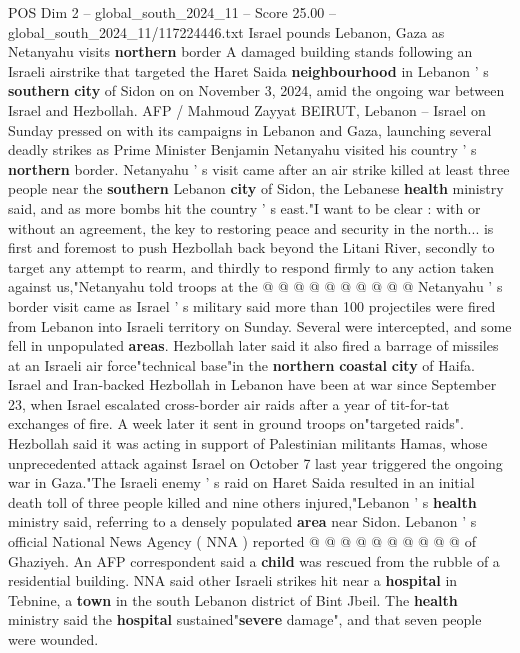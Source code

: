 \begin{textsample}{POS Dim 2 – global\_south\_2024\_11 – Score 25.00 – global\_south\_2024\_11/117224446.txt}  \label{ex:f2_pos_247}
Israel pounds Lebanon, Gaza as Netanyahu visits \textbf{northern} border A damaged building stands following an Israeli airstrike that targeted the Haret Saida \textbf{neighbourhood} in Lebanon ' s \textbf{southern} \textbf{city} of Sidon on on November 3, 2024, amid the ongoing war between Israel and Hezbollah.
AFP / Mahmoud Zayyat BEIRUT, Lebanon -- Israel on Sunday pressed on with its campaigns in Lebanon and Gaza, launching several deadly strikes as Prime Minister Benjamin Netanyahu visited his country ' s \textbf{northern} border.
Netanyahu ' s visit came after an air strike killed at least three people near the \textbf{southern} Lebanon \textbf{city} of Sidon, the Lebanese \textbf{health} ministry said, and as more bombs hit the country ' s east."I want to be clear : with or without an agreement, the key to restoring peace and security in the north... is first and foremost to push Hezbollah back beyond the Litani River, secondly to target any attempt to rearm, and thirdly to respond firmly to any action taken against us,"Netanyahu told troops at the @ @ @ @ @ @ @ @ @ @ Netanyahu ' s border visit came as Israel ' s military said more than 100 projectiles were fired from Lebanon into Israeli territory on Sunday.
Several were intercepted, and some fell in unpopulated \textbf{areas}.
Hezbollah later said it also fired a barrage of missiles at an Israeli air force"technical base"in the \textbf{northern} \textbf{coastal} \textbf{city} of Haifa.
Israel and Iran-backed Hezbollah in Lebanon have been at war since September 23, when Israel escalated cross-border air raids after a year of tit-for-tat exchanges of fire.
A week later it sent in ground troops on"targeted raids".
Hezbollah said it was acting in support of Palestinian militants Hamas, whose unprecedented attack against Israel on October 7 last year triggered the ongoing war in Gaza."The Israeli enemy ' s raid on Haret Saida resulted in an initial death toll of three people killed and nine others injured,"Lebanon ' s \textbf{health} ministry said, referring to a densely populated \textbf{area} near Sidon.
Lebanon ' s official National News Agency ( NNA ) reported @ @ @ @ @ @ @ @ @ @ of Ghaziyeh.
An AFP correspondent said a \textbf{child} was rescued from the rubble of a residential building.
NNA said other Israeli strikes hit near a \textbf{hospital} in Tebnine, a \textbf{town} in the south Lebanon district of Bint Jbeil.
The \textbf{health} ministry said the \textbf{hospital} sustained"\textbf{severe} damage", and that seven people were wounded.

\end{textsample}

